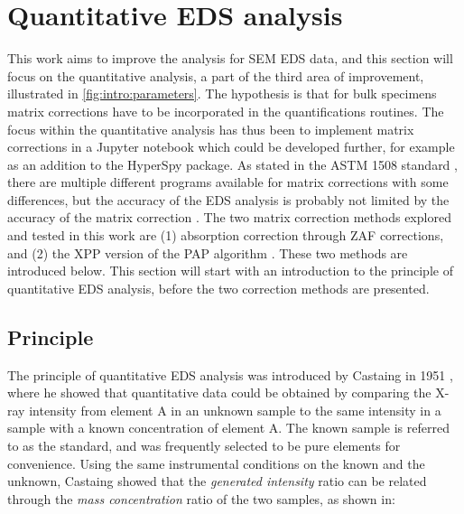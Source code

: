 \section{Quantitative EDS analysis}
\label{theory:quantitative}





This work aims to improve the analysis for SEM EDS data, and this section will focus on the quantitative analysis, a part of the third area of improvement, illustrated in \cref{fig:intro:parameters}.
The hypothesis is that for bulk specimens matrix corrections have to be incorporated in the quantifications routines.
The focus within the quantitative analysis has thus been to implement matrix corrections in a Jupyter notebook which could be developed further, for example as an addition to the HyperSpy package.
As stated in the ASTM 1508 standard \cite{astm_e1508_eds_quantification}, there are multiple different programs available for matrix corrections with some differences, but the accuracy of the EDS analysis is probably not limited by the accuracy of the matrix correction \cite{astm_e1508_eds_quantification}.
The two matrix correction methods explored and tested in this work are (1) absorption correction through ZAF corrections, and (2) the XPP version of the PAP algorithm \cite{pap_1991}.
These two methods are introduced below.
This section will start with an introduction to the principle of quantitative EDS analysis, before the two correction methods are presented.






\subsection{Principle}
\label{theory:quantitative:principle}

The principle of quantitative EDS analysis was introduced by Castaing in 1951 \cite{castaing_1951}, where he showed that quantitative data could be obtained by comparing the X-ray intensity from element A in an unknown sample to the same intensity in a sample with a known concentration of element A.
The known sample is referred to as the standard, and was frequently selected to be pure elements for convenience.
Using the same instrumental conditions on the known and the unknown, Castaing showed that the \emph{generated intensity} ratio can be related through the \emph{mass concentration} ratio of the two samples, as shown in:

